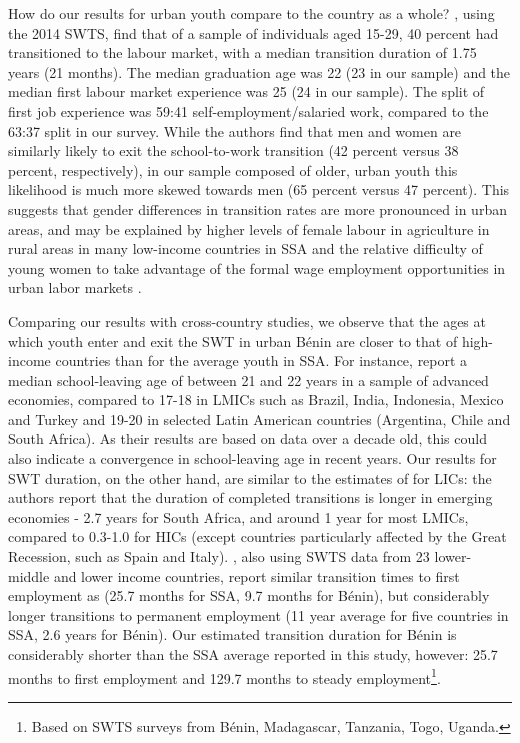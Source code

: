 \documentclass[
  a4paper, twoside, 12pt]{book}
\begin{document}
How do our results for urban youth compare to the country as a whole? \textcite{dedehouanou2019}, using the 2014 SWTS, find that of a sample of individuals aged 15-29, 40 percent had transitioned to the labour market, with a median transition duration of 1.75 years (21 months). The median graduation age was 22 (23 in our sample) and the median first labour market experience was 25 (24 in our sample). The split of first job experience was 59:41 self-employment/salaried work, compared to the 63:37 split in our survey. While the authors find that men and women are similarly likely to exit the school-to-work transition (42 percent versus 38 percent, respectively), in our sample composed of older, urban youth this likelihood is much more skewed towards men (65 percent versus 47 percent). This suggests that gender differences in transition rates are more pronounced in urban areas, and may be explained by higher levels of female labour in agriculture in rural areas in many low-income countries in SSA \autocite{croppenstedt2013} and the relative difficulty of young women to take advantage of the formal wage employment opportunities in urban labor markets \autocite{fox2012,fox2016a}.

Comparing our results with cross-country studies, we observe that the ages at which youth enter and exit the SWT in urban Bénin are closer to that of high-income countries than for the average youth in SSA. For instance, \textcite{quintini2014} report a median school-leaving age of between 21 and 22 years in a sample of advanced economies, compared to 17-18 in LMICs such as Brazil, India, Indonesia, Mexico and Turkey and 19-20 in selected Latin American countries (Argentina, Chile and South Africa). As their results are based on data over a decade old, this could also indicate a convergence in school-leaving age in recent years. Our results for SWT duration, on the other hand, are similar to the estimates of \textcite{quintini2014} for LICs: the authors report that the duration of completed transitions is longer in emerging economies - 2.7 years for South Africa, and around 1 year for most LMICs, compared to 0.3-1.0 for HICs (except countries particularly affected by the Great Recession, such as Spain and Italy). \textcite{manacorda2017}, also using SWTS data from 23 lower-middle and lower income countries, report similar transition times to first employment as \textcite{quintini2014} (25.7 months for SSA, 9.7 months for Bénin), but considerably longer transitions to permanent employment (11 year average for five countries in SSA, 2.6 years for Bénin). Our estimated transition duration for Bénin is considerably shorter than the SSA average reported in this study, however: 25.7 months to first employment and 129.7 months to steady employment\footnote{Based on SWTS surveys from Bénin, Madagascar, Tanzania, Togo, Uganda.}.
\end{document}
